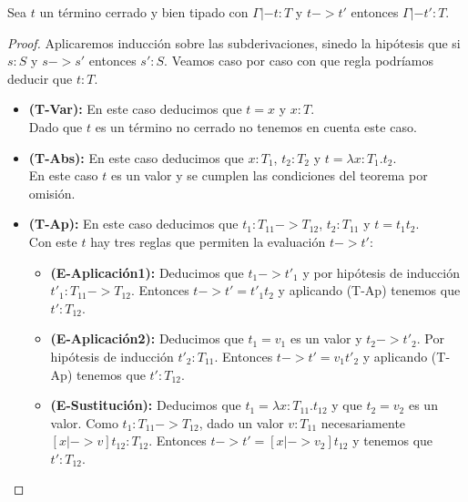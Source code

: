 \begin{theorem}
\label{theo:pres_lambda}
  Sea $t$ un término cerrado y bien tipado con $\Gamma |- t:T$ y $t -> t'$ entonces $\Gamma |- t':T$.
\end{theorem}

\begin{proof}
  Aplicaremos inducción sobre las subderivaciones, sinedo la hipótesis que si $s:S$ y $s -> s'$ entonces $s':S$. Veamos caso por caso con que regla podríamos deducir que $t:T$.\\
  
  \begin{itemize}
    \item \textbf{(T-Var):} En este caso deducimos que $t=x$ y $x:T$.\\
    Dado que $t$ es un término no cerrado no tenemos en cuenta este caso.\\
    
    \item \textbf{(T-Abs):} En este caso deducimos que $x:T_1$, $t_2:T_2$ y $t=\lambda x:T_1.t_2$.\\
    En este caso $t$ es un valor y se cumplen las condiciones del teorema por omisión.
    
    \item \textbf{(T-Ap):} En este caso deducimos que $t_1:T_{11} -> T_{12}$, $t_2:T_{11}$ y $t = t_1t_2$.\\
    Con este $t$ hay tres reglas que permiten la evaluación $t -> t'$:\\
    
    \begin{itemize}
      \item \textbf{(E-Aplicación1):} Deducimos que $t_1 -> t'_1$ y por hipótesis de inducción $t'_1:T_{11} -> T_{12}$. Entonces $t -> t' = t'_1t_2$ y aplicando (T-Ap) tenemos que $t':T_{12}$.\\
      
      \item \textbf{(E-Aplicación2):} Deducimos que $t_1 = v_1$ es un valor y $t_2 -> t'_2$. Por hipótesis de inducción $t'_2:T_{11}$. Entonces $t -> t' = v_1t'_2$ y aplicando (T-Ap) tenemos que $t':T_{12}$.\\
      
      \item \textbf{(E-Sustitución):} Deducimos que $t_1 = \lambda x:T_{11}.t_{12}$ y que $t_2 = v_2$ es un valor. Como $t_1:T_{11} -> T_{12}$, dado un valor $v:T_{11}$ necesariamente $[x |-> v]t_{12} : T_{12}$. Entonces $t -> t' = [x |-> v_2]t_{12}$ y tenemos que $t':T_{12}$.\\
    \end{itemize}
  \end{itemize}
\end{proof}
